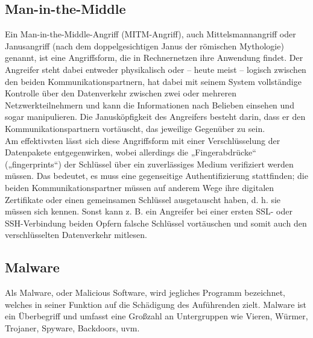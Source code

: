 \subsection{Man-in-the-Middle}
Ein Man-in-the-Middle-Angriff (MITM-Angriff), auch Mittelsmannangriff oder Janusangriff (nach dem doppelgesichtigen Janus der römischen Mythologie) genannt, ist eine Angriffsform, die in Rechnernetzen ihre Anwendung findet. Der Angreifer steht dabei entweder physikalisch oder – heute meist – logisch zwischen den beiden Kommunikationspartnern, hat dabei mit seinem System vollständige Kontrolle über den Datenverkehr zwischen zwei oder mehreren Netzwerkteilnehmern und kann die Informationen nach Belieben einsehen und sogar manipulieren. Die Janusköpfigkeit des Angreifers besteht darin, dass er den Kommunikationspartnern vortäuscht, das jeweilige Gegenüber zu sein.\\

Am effektivsten lässt sich diese Angriffsform mit einer Verschlüsselung der Datenpakete entgegenwirken, wobei allerdings die „Fingerabdrücke“ („fingerprints“) der Schlüssel über ein zuverlässiges Medium verifiziert werden müssen. Das bedeutet, es muss eine gegenseitige Authentifizierung stattfinden; die beiden Kommunikationspartner müssen auf anderem Wege ihre digitalen Zertifikate oder einen gemeinsamen Schlüssel ausgetauscht haben, d. h. sie müssen sich kennen. Sonst kann z. B. ein Angreifer bei einer ersten SSL- oder SSH-Verbindung beiden Opfern falsche Schlüssel vortäuschen und somit auch den verschlüsselten Datenverkehr mitlesen.\\
\subsection{Malware}
Als Malware, oder Malicious Software, wird jegliches Programm bezeichnet, welches in seiner Funktion auf die Schädigung des Auführenden zielt. Malware ist ein Überbegriff und umfasst eine Großzahl an Untergruppen wie Vieren, Würmer, Trojaner, Spyware, Backdoors, uvm.\\

